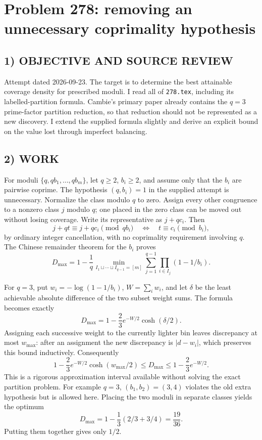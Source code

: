 \section{Problem 278: removing an unnecessary coprimality hypothesis}
\subsection*{1) OBJECTIVE AND SOURCE REVIEW}
Attempt dated 2026-09-23. The target is to determine the best attainable coverage density for prescribed moduli. I read all of \texttt{278.tex}, including its labelled-partition formula. Cambie's primary paper already contains the $q=3$ prime-factor partition reduction, so that reduction should not be represented as a new discovery. I extend the supplied formula slightly and derive an explicit bound on the value lost through imperfect balancing.
\subsection*{2) WORK}
For moduli $\{q,qb_1,\ldots,qb_m\}$, let $q\ge2$, $b_i\ge2$, and assume only that the $b_i$ are pairwise coprime. The hypothesis $(q,b_i)=1$ in the supplied attempt is unnecessary. Normalize the class modulo $q$ to zero. Assign every other congruence to a nonzero class $j$ modulo $q$; one placed in the zero class can be moved out without losing coverage. Write its representative as $j+qc_i$. Then
\[
j+qt\equiv j+qc_i\pmod{qb_i}
\quad\Longleftrightarrow\quad t\equiv c_i\pmod{b_i},
\]
by ordinary integer cancellation, with no coprimality requirement involving $q$. The Chinese remainder theorem for the $b_i$ proves
\[
D_{\max}=1-\frac1q\min_{I_1\sqcup\cdots\sqcup I_{q-1}=[m]}
\sum_{j=1}^{q-1}\prod_{i\in I_j}(1-1/b_i).
\]

For $q=3$, put $w_i=-\log(1-1/b_i)$, $W=\sum_iw_i$, and let $\delta$ be the least achievable absolute difference of the two subset weight sums. The formula becomes exactly
\[
D_{\max}=1-\frac23e^{-W/2}\cosh(\delta/2).
\]
Assigning each successive weight to the currently lighter bin leaves discrepancy at most $w_{\max}$: after an assignment the new discrepancy is $|d-w_i|$, which preserves this bound inductively. Consequently
\[
1-\frac23e^{-W/2}\cosh(w_{\max}/2)
\le D_{\max}\le1-\frac23e^{-W/2}.
\]
This is a rigorous approximation interval available without solving the exact partition problem. For example $q=3$, $(b_1,b_2)=(3,4)$ violates the old extra hypothesis but is allowed here. Placing the two moduli in separate classes yields the optimum
\[
D_{\max}=1-\frac13(2/3+3/4)=\frac{19}{36}.
\]
Putting them together gives only $1/2$.
